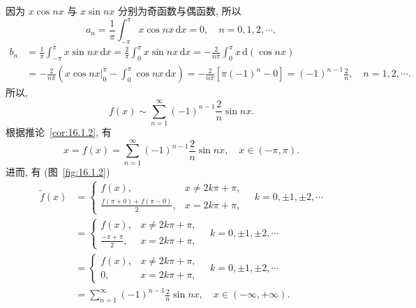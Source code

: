 \begin{solution}
因为 $x\cos nx$ 与 $x\sin nx$ 分别为奇函数与偶函数, 所以
\[
  a_{n}=\frac{1}{\pi}\int_{-\pi}^{\pi}x\cos nx\,\mathrm{d}x=0,\quad n=0,1,2,\cdots,
\]
\[
  \begin{aligned}
    b_{n}&=\frac{1}{\pi}\int_{-\pi}^{\pi}x\sin nx\,\mathrm{d}x=\frac{2}{\pi}\int_{0}^{\pi}x\sin nx\,\mathrm{d}x=-\frac{2}{n\pi}\int_{0}^{\pi}x\,\mathrm{d}(\cos nx)\\
    &=-\frac{2}{n\pi}\left(\left.x\cos nx\right|_{0}^{\pi}-\int_{0}^{\pi}\cos nx\,\mathrm{d}x\right)=-\frac{2}{n\pi}[\pi(-1)^{n}-0]=(-1)^{n-1}\frac{2}{n},\quad n=1,2,\cdots.
  \end{aligned}
\]
所以,
\[
  f(x)\sim\sum_{n=1}^{\infty}(-1)^{n-1}\frac{2}{n}\sin nx.
\]
根据推论~\ref{cor:16.1.2}, 有
\[
  x=f(x)=\sum_{n=1}^{\infty}(-1)^{n-1}\frac{2}{n}\sin nx,\quad x\in(-\pi,\pi).
\]
进而, 有 (图~\ref{fig:16.1.2})
\[
  \begin{aligned}
    \tilde{f}(x)&=\begin{cases}
      f(x), & x\neq 2k\pi+\pi,\\
      \displaystyle\frac{f(\pi+0)+f(\pi-0)}{2}, & x=2k\pi+\pi,
\end{cases}\quad k=0,\pm 1,\pm 2,\cdots\\
    &=\begin{cases}
      f(x), & x\neq 2k\pi+\pi,\\
      \displaystyle\frac{-\pi+\pi}{2}, & x=2k\pi+\pi,
\end{cases}\quad k=0,\pm 1,\pm 2,\cdots\\
    &=\begin{cases}
      f(x), & x\neq 2k\pi+\pi,\\
      0, & x=2k\pi+\pi,
\end{cases}\quad k=0,\pm 1,\pm 2,\cdots\\
    &=\sum_{n=1}^{\infty}(-1)^{n-1}\frac{2}{n}\sin nx,\quad x\in(-\infty,+\infty).
  \end{aligned}
\]

\begin{figure}[htbp]
\centering
{}
\end{figure}
\end{solution}
